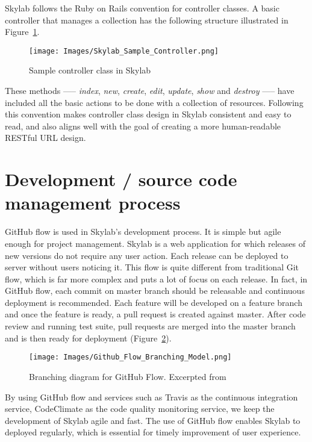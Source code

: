 Skylab follows the Ruby on Rails convention for controller classes. A basic controller that manages a collection has the following structure illustrated in Figure~\ref{fig:SkylabSampleController}.

\begin{figure}[h]
  \centering
  \texttt{[image: Images/Skylab\_Sample\_Controller.png]}
  \caption{Sample controller class in Skylab}
  \label{fig:SkylabSampleController}
\end{figure}

These methods —-- \textit{index}, \textit{new}, \textit{create}, \textit{edit}, \textit{update}, \textit{show} and \textit{destroy} —-- have included all the basic actions to be done with a collection of resources. Following this convention makes controller class design in Skylab consistent and easy to read, and also aligns well with the goal of creating a more human-readable RESTful URL design.

\section{Development / source code management process}

GitHub flow is used in Skylab's development process. It is simple but agile enough for project management. Skylab is a web application for which releases of new versions do not require any user action. Each release can be deployed to server without users noticing it. This flow is quite different from traditional Git flow, which is far more complex and puts a lot of focus on each release\cite{citation8}. In fact, in GitHub flow, each commit on master branch should be releasable and continuous deployment is recommended\cite{citation8}. Each feature will be developed on a feature branch and once the feature is ready, a pull request is created against master. After code review and running test suite, pull requests are merged into the master branch and is then ready for deployment (Figure~\ref{fig:GithubFlow}).

\begin{figure}[h]
  \centering
  \texttt{[image: Images/Github\_Flow\_Branching\_Model.png]}
  \caption{Branching diagram for GitHub Flow. Excerpted from \cite{citation8}}
  \label{fig:GithubFlow}
\end{figure}

By using GitHub flow and services such as Travis as the continuous integration service\cite{citationtravis}, CodeClimate as the code quality monitoring service\cite{citationcodeclimate}, we keep the development of Skylab agile and fast. The use of GitHub flow enables Skylab to deployed regularly, which is essential for timely improvement of user experience\cite{citation9}.
